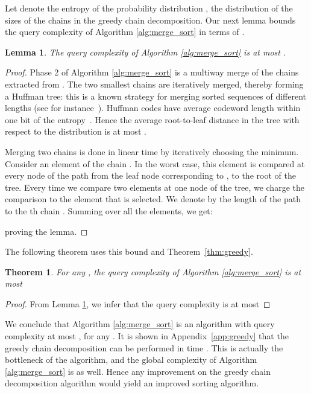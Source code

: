 \documentclass{article} \usepackage{fullpage}
\newtheorem{lemma}{Lemma}
\newtheorem{theorem}{Theorem}
\begin{document}
Let  denote the entropy of the probability distribution , the distribution of the sizes of the chains in the greedy chain decomposition. Our next lemma bounds the query complexity of Algorithm \ref{alg:merge_sort} in terms of .
\begin{lemma}
\label{lem:Huffman}
The query complexity of Algorithm \ref{alg:merge_sort} is at most .
\end{lemma}
\begin{proof}
Phase 2 of Algorithm \ref{alg:merge_sort} is a multiway merge of the chains  extracted from . The two smallest chains are iteratively merged, thereby forming a Huffman tree: this is a known strategy for merging sorted sequences of different lengths (see for instance~\cite{FB72}). Huffman codes have average codeword length within one bit of the entropy~\cite{TC}. Hence the average root-to-leaf distance in the tree with respect to the distribution  is at most .

Merging two chains is done in linear time by iteratively choosing the minimum. Consider an element of the chain . In the worst case, this element is compared at every node of the path from the leaf node corresponding to , to the root of the tree. Every time we compare two elements at one node of the tree, we charge the comparison to the element that is selected. We denote by  the length of the path to the th chain . Summing over all the elements, we get:

proving the lemma.
\end{proof}

The following theorem uses this bound and Theorem~\ref{thm:greedy}.
\begin{theorem}
\label{thm:nearopt}
For any , the query complexity of Algorithm \ref{alg:merge_sort} is at most

\end{theorem}

\begin{proof}
From Lemma \ref{lem:Huffman}, we infer that the query complexity is at most

\end{proof}
We conclude that Algorithm \ref{alg:merge_sort} is an algorithm with query complexity at most , for any . It is shown in Appendix~\ref{app:greedy} that the greedy chain decomposition can be performed in time . This is actually the bottleneck of the algorithm, and the global complexity of Algorithm \ref{alg:merge_sort} is  as well. Hence any improvement on the greedy chain decomposition algorithm would yield an improved sorting algorithm.
\end{document}
